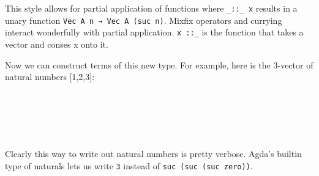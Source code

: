 This style allows for partial application of functions where \texttt{\_::\_ x} results
in a unary function \texttt{Vec A n → Vec A (suc n)}.
Mixfix operators and currying interact wonderfully with partial application. \texttt{x ::\_} is the
function that takes a vector and conses x onto it.

Now we can construct terms of this new type.
For example, here is the 3-vector of natural numbers [1,2,3]:
\begin{code}%
\>[0]\AgdaSpace{}%
\AgdaSymbol{:}\AgdaSpace{}%
\AgdaSpace{}%
\AgdaSpace{}%
\AgdaSymbol{(}\AgdaSpace{}%
\AgdaSymbol{(}\AgdaSpace{}%
\AgdaSymbol{(}\AgdaSpace{}%
\AgdaSymbol{)))}\<%
\\
\>[0]\AgdaSpace{}%
\AgdaSymbol{=}\AgdaSpace{}%
\AgdaSpace{}%
\<%
\\
\>[0][@{}l@{\AgdaIndent{0}}]%
\>[2]\AgdaOperator{\AgdaInductiveConstructor{::}}\AgdaSpace{}%
\AgdaSymbol{(}\AgdaSpace{}%
\AgdaSymbol{(}\AgdaSpace{}%
\AgdaSymbol{)}\<%
\\
\>[2][@{}l@{\AgdaIndent{0}}]%
\>[4]\AgdaOperator{\AgdaInductiveConstructor{::}}\AgdaSpace{}%
\AgdaSymbol{(}\AgdaSpace{}%
\AgdaSymbol{(}\AgdaSpace{}%
\AgdaSymbol{(}\AgdaSpace{}%
\AgdaSymbol{))}\<%
\\
\>[4][@{}l@{\AgdaIndent{0}}]%
\>[6]\AgdaOperator{\AgdaInductiveConstructor{::}}\AgdaSpace{}%
\AgdaInductiveConstructor{[]}\AgdaSymbol{))}\<%
\end{code}
Clearly this way to write out natural numbers is pretty verbose.
Agda's builtin type of naturals lets us write \texttt{3} instead of \texttt{suc (suc (suc zero))}.

